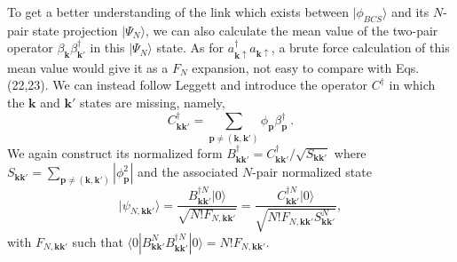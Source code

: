 \documentclass[twocolumn,showpacs]{revtex4}
\def\v#1{\mathbf{#1}}
\begin{document}
To get a better understanding of the link which exists between $|\phi_{BCS}\rangle$ and its $N$-pair state projection $|\Psi_N\rangle$, we can also calculate the mean value of the two-pair operator $\beta_{\v k}^{}\beta_{\v k'}^\dag$ in this $|\Psi_N\rangle$ state. As for $a_{\v k\uparrow}^\dag a_{\v k\uparrow}$, a brute force calculation of this mean value would give it as a $F_N$ expansion, not easy to compare with Eqs.(22,23). We can instead follow Leggett \cite{Leggett} and introduce the operator $C^\dag$ in which the $\v k$ and $\v k'$ states are missing, namely,
\begin{equation}
C_{\v k\v k'}^\dag=\sum_{\v p\neq (\v k,\v k')}\phi_{\v p}\beta_{\v p}^\dag\ .
\end{equation}
We again construct its normalized form $B_{\v k\v k'}^\dag=C_{\v k\v k'}^\dag/\sqrt{S_{\v k\v k'}}$ where $S_{\v k\v k'}=\sum_{\v p\neq (\v k,\v k')}|\phi_{\v p}^2|$ and the associated $N$-pair normalized state
\begin{equation}
|\psi_{N,\v k\v k'}\rangle=\frac{B_{\v k\v k'}^{\dag N}|0\rangle}{\sqrt{N!F_{N,\v k\v k'}}}=
\frac{C_{\v k\v k'}^{\dag N}|0\rangle}{\sqrt{N!F_{N,\v k\v k'}S_{\v k\v k'}^N}},
\end{equation}
with $F_{N,\v k\v k'}$ such that $\langle 0|B_{\v k\v k'}^NB_{\v k\v k'}^{\dag N}|0\rangle=N!F_{N,\v k\v k'}$.
\end{document}
